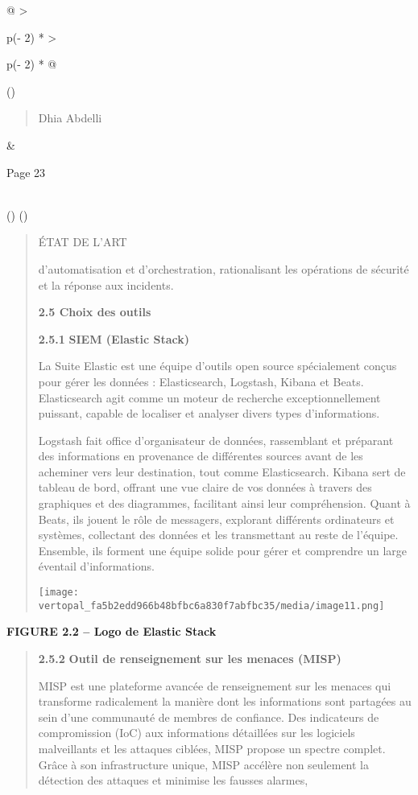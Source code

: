 \documentclass[
]{article}
\begin{document}
\begin{longtable}[]{@{}
  >{\raggedright\arraybackslash}p{(\columnwidth - 2\tabcolsep) * }
  >{\raggedright\arraybackslash}p{(\columnwidth - 2\tabcolsep) * }@{}}
\toprule()
\begin{minipage}[b]{\linewidth}\raggedright
\begin{quote}
Dhia Abdelli
\end{quote}
\end{minipage} & \begin{minipage}[b]{\linewidth}\raggedright
Page 23
\end{minipage} \\
\midrule()
\endhead
\bottomrule()
\end{longtable}

\begin{quote}
ÉTAT DE L'ART

d'automatisation et d'orchestration, rationalisant les opérations de
sécurité et la réponse aux incidents.

\textbf{2.5 Choix des outils}

\textbf{2.5.1} \textbf{SIEM (Elastic Stack)}

La Suite Elastic est une équipe d'outils open source spécialement conçus
pour gérer les données : Elasticsearch, Logstash, Kibana et Beats.
Elasticsearch agit comme un moteur de recherche exceptionnellement
puissant, capable de localiser et analyser divers types d'informations.

Logstash fait office d'organisateur de données, rassemblant et préparant
des informations en provenance de différentes sources avant de les
acheminer vers leur destination, tout comme Elasticsearch. Kibana sert
de tableau de bord, offrant une vue claire de vos données à travers des
graphiques et des diagrammes, facilitant ainsi leur compréhension. Quant
à Beats, ils jouent le rôle de messagers, explorant différents
ordinateurs et systèmes, collectant des données et les transmettant au
reste de l'équipe. Ensemble, ils forment une équipe solide pour gérer et
comprendre un large éventail d'informations.

\texttt{[image: vertopal\_fa5b2edd966b48bfbc6a830f7abfbc35/media/image11.png]}
\end{quote}

\textbf{FIGURE 2.2 -- Logo de Elastic Stack}

\begin{quote}
\textbf{2.5.2} \textbf{Outil de renseignement sur les menaces (MISP)}

MISP est une plateforme avancée de renseignement sur les menaces qui
transforme radicalement la manière dont les informations sont partagées
au sein d'une communauté de membres de confiance. Des indicateurs de
compromission (IoC) aux informations détaillées sur les logiciels
malveillants et les attaques ciblées, MISP propose un spectre complet.
Grâce à son infrastructure unique, MISP accélère non seulement la
détection des attaques et minimise les fausses alarmes,
\end{quote}
\end{document}
